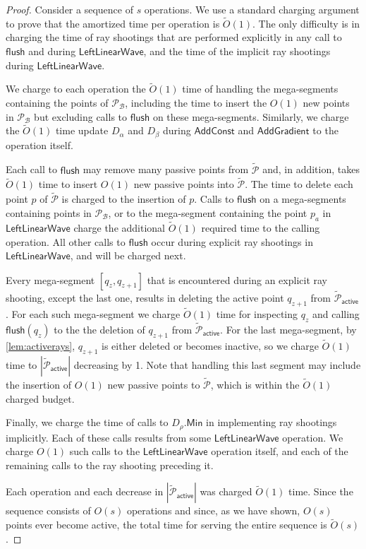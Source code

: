 \documentclass[10pt,a4paper]{article}
\newcommand{\AC}{\mathsf{AddConst}}
\newcommand{\AG}{\mathsf{AddGradient}}
\newcommand{\LLW}{\mathsf{LeftLinearWave}}
\newcommand{\local}{\text{short }}
\newcommand{\longrange}{\text{long }}
\newcommand{\Min}{\mathsf{Min}}
\renewcommand{\P}{\mathcal{P}}
\newcommand{\TAP}{\tilde{\P}_{\mathsf{active}}}
\newcommand{\TP}{\tilde{\P}}
\newcommand{\B}{\mathcal{B}}
\newcommand{\flush}{\mathsf{flush}}
\begin{document}
\begin{proof}
Consider a sequence of $s$ operations. We use a standard charging argument to prove that the amortized time per operation is $\tilde O(1)$.  
The only difficulty is in charging the time of ray shootings that are performed explicitly in any call to $\flush$ and during $\LLW$, and the time of the implicit \local ray shootings during $\LLW$. 

We charge to each operation the $\tilde O(1)$ time of handling the mega-segments containing the points of $\P_{\B}$, including the time to insert the $O(1)$ new points in $\P_{\B}$ but excluding calls to $\flush$ on these mega-segments. 
Similarly, we charge the $\tilde O(1)$ time update $D_\alpha$ and $D_\beta$ during $\AC$ and $\AG$ to the operation itself.

Each call to $\flush$ may remove  many passive points from $\TP$ and, in addition, takes $\tilde O(1)$ time to insert $O(1)$ new passive points into $\TP$. 
The time to delete each point $p$ of $\TP$ is charged to the insertion of $p$. Calls to $\flush$ on a mega-segments containing points in $\P_{\B}$, or to the mega-segment containing the point $p_a$ in $\LLW$ charge the additional $\tilde O(1)$ required time to the calling operation. All other calls to $\flush$ occur during explicit \longrange ray shootings in $\LLW$, and will be charged next.

Every mega-segment $[q_z,q_{z+1}]$ that is encountered during an explicit \longrange ray shooting, except the last one, results in deleting the active point $q_{z+1}$ from $\TAP$. 
For each such mega-segment we charge $\tilde O(1)$ time for inspecting $q_z$ and calling $\flush(q_z)$ to the the deletion of $q_{z+1}$ from $\TAP$. 
For the last mega-segment, by \cref{lem:activerays}, $q_{z+1}$ is either deleted or becomes inactive, so we charge $\tilde O(1)$ time to $|\TAP|$ decreasing by 1. Note that handling this last segment may include the insertion of $O(1)$ new passive points to $\TP$, which is within the $\tilde O(1)$ charged budget.

Finally, we charge the time of calls to $D_\rho.\Min$ in implementing \local ray shootings implicitly. Each of these calls results from some $\LLW$ operation. 
We charge $O(1)$ such calls to the $\LLW$ operation itself, and each of the remaining calls to the \longrange ray shooting preceding it.

Each operation and each decrease in $|\TAP|$ was charged $\tilde O(1)$ time. Since the sequence consists of $O(s)$ operations and since, as we have shown, $O(s)$ points ever become active, the total time for serving the entire sequence is $\tilde O(s)$.


\end{proof}
\end{document}
